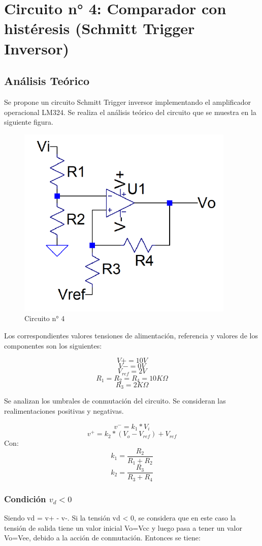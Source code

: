 \section{Circuito n° 4: Comparador con histéresis (Schmitt Trigger Inversor)}



\subsection{Análisis Teórico}

Se propone un circuito Schmitt Trigger inversor implementando el amplificador operacional LM324. Se realiza el análisis teórico del circuito que se muestra en la siguiente figura. 


\begin{figure}[h!]
    \centering
    \includegraphics[width=0.70\linewidth]{Secciones/Circuito4/Circuito 4.png}
    \caption{Circuito n° 4}
    \label{fig:Circuito4}
\end{figure}

Los correspondientes valores tensiones de alimentación, referencia y valores de los componentes son los siguientes:

\[V+ = 10V\]
\[V- = 0V\]
\[V_{ref} = 2V\]
\[R_1 = R_2 = R_4 = 10K\Omega\]
\[R_3 = 2K\Omega\]

Se analizan los umbrales de conmutación del circuito. Se consideran las realimentaciones positivas y negativas.

\[v^- = k_1 * V_i\]
\[v^+ = k_2 * (V_o - V_{ref}) + V_{ref}\]
Con:
\[k_1 = \frac{R_2}{R_1 + R_2}\]
\[ k_2 = \frac{R_3}{R_3 + R_4}\]
\subsubsection{Condición \texorpdfstring{$v_d < 0$}{vd < 0}}
Siendo vd = v+ - v-. Si la tensión vd < 0, se considera que en este caso la tensión de salida tiene un valor inicial Vo=Vcc y luego pasa a tener un valor Vo=Vee, debido a la acción de conmutación.  Entonces se tiene:

